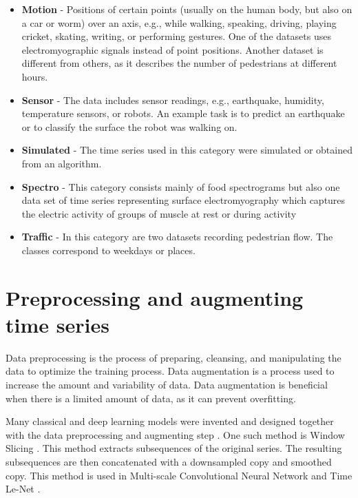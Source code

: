 \documentclass[a4paper,11pt,twoside]{report}
\theoremstyle{definition}
\begin{document}
\begin{itemize}
\item \textbf{Motion} - Positions of certain points (usually on the human body, but also on a car or worm) over an axis, e.g., while walking, speaking, driving, playing cricket, skating, writing, or performing gestures. One of the datasets uses electromyographic signals instead of point positions. Another dataset is different from others, as it describes the number of pedestrians at different hours.


\item \textbf{Sensor} - The data includes sensor readings, e.g., earthquake, humidity, temperature sensors, or robots. An example task is to predict an earthquake or to classify the surface the robot was walking on.

\item \textbf{Simulated} - The time series used in this category were simulated or obtained from an algorithm.

\item \textbf{Spectro} - This category consists mainly of food spectrograms but also one data set of time series representing  surface electromyography which captures the electric activity of groups of muscle at rest or during activity

\item \textbf{Traffic} - In this category are two datasets recording pedestrian flow. The classes correspond to weekdays or places.


\end{itemize}


\section{Preprocessing and augmenting time series}
Data preprocessing is the process of preparing, cleansing, and manipulating the data to optimize the training process. Data augmentation is a process used to increase the amount and variability of data. Data augmentation is beneficial when there is a limited amount of data, as it can prevent overfitting.

Many classical and deep learning models were invented and designed together with the data preprocessing and augmenting step \cite{bake_off, dl_tsc}. One such method is Window Slicing \cite{dl_tsc}. This method extracts subsequences of the original series. The resulting subsequences are then concatenated with a downsampled copy and smoothed copy. This method is used in Multi-scale Convolutional Neural Network \cite{multiscale} and Time Le-Net \cite{timelenet}.
\end{document}
